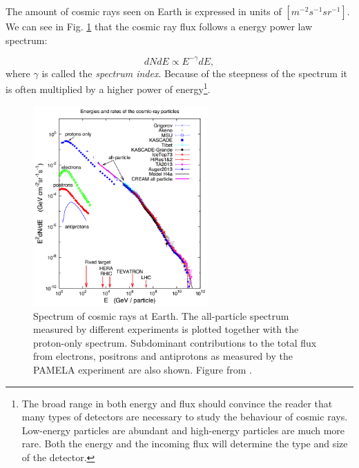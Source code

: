 The amount of cosmic rays seen on Earth is expressed in units of $\left[m^{-2} s^{-1} sr^{-1}\right]$. We can see in Fig. \ref{fig:spectrumCR} that the cosmic ray flux follows a energy power law spectrum:

\begin{equation}
\label{eq:spectrum}
dNdE \varpropto E^{-\gamma} dE,
\end{equation} 
where $\gamma$ is called the \textit{spectrum index}. Because of the steepness of the spectrum it is often multiplied by a higher power of energy\footnote{The broad range in both energy and flux should convince the reader that many types of detectors are necessary to study the behaviour of cosmic rays. Low-energy particles are abundant and high-energy particles are much more rare. Both the energy and the incoming flux will determine the type and size of the detector.}.

\begin{figure}
\label{fig:spectrumCR}
\centering
\includegraphics[width = 0.6\textwidth]{chapter3/img/spectrumCR.png}
\caption{Spectrum of cosmic rays at Earth. The all-particle spectrum measured by different experiments is plotted together with the proton-only spectrum. Subdominant contributions to the total flux from electrons, positrons and antiprotons as measured by the PAMELA experiment are also shown. Figure from \cite{Blasi:2013rva}.}
\end{figure}

